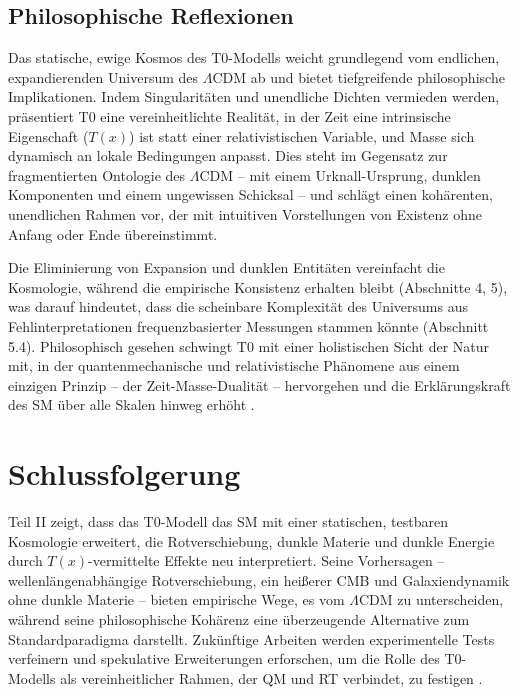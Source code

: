 \documentclass[12pt,a4paper]{article}
\newcommand{\Tfield}{T(x)}
\begin{document}
	\subsection{Philosophische Reflexionen}
	\label{subsec:philosophical_reflections}
	
	Das statische, ewige Kosmos des T0-Modells weicht grundlegend vom endlichen, expandierenden Universum des \(\Lambda\)CDM ab und bietet tiefgreifende philosophische Implikationen. Indem Singularitäten und unendliche Dichten vermieden werden, präsentiert T0 eine vereinheitlichte Realität, in der Zeit eine intrinsische Eigenschaft (\(\Tfield\)) ist statt einer relativistischen Variable, und Masse sich dynamisch an lokale Bedingungen anpasst. Dies steht im Gegensatz zur fragmentierten Ontologie des \(\Lambda\)CDM – mit einem Urknall-Ursprung, dunklen Komponenten und einem ungewissen Schicksal – und schlägt einen kohärenten, unendlichen Rahmen vor, der mit intuitiven Vorstellungen von Existenz ohne Anfang oder Ende übereinstimmt.
	
	Die Eliminierung von Expansion und dunklen Entitäten vereinfacht die Kosmologie, während die empirische Konsistenz erhalten bleibt (Abschnitte 4, 5), was darauf hindeutet, dass die scheinbare Komplexität des Universums aus Fehlinterpretationen frequenzbasierter Messungen stammen könnte (Abschnitt 5.4). Philosophisch gesehen schwingt T0 mit einer holistischen Sicht der Natur mit, in der quantenmechanische und relativistische Phänomene aus einem einzigen Prinzip – der Zeit-Masse-Dualität – hervorgehen und die Erklärungskraft des SM über alle Skalen hinweg erhöht \cite{pascher_perspective_2025}.
	
	\section{Schlussfolgerung}
	\label{sec:conclusion}
	
	Teil II zeigt, dass das T0-Modell das SM mit einer statischen, testbaren Kosmologie erweitert, die Rotverschiebung, dunkle Materie und dunkle Energie durch \(\Tfield\)-vermittelte Effekte neu interpretiert. Seine Vorhersagen – wellenlängenabhängige Rotverschiebung, ein heißerer CMB und Galaxiendynamik ohne dunkle Materie – bieten empirische Wege, es vom \(\Lambda\)CDM zu unterscheiden, während seine philosophische Kohärenz eine überzeugende Alternative zum Standardparadigma darstellt. Zukünftige Arbeiten werden experimentelle Tests verfeinern und spekulative Erweiterungen erforschen, um die Rolle des T0-Modells als vereinheitlicher Rahmen, der QM und RT verbindet, zu festigen \cite{pascher_perspective_2025}.
	
\end{document}
